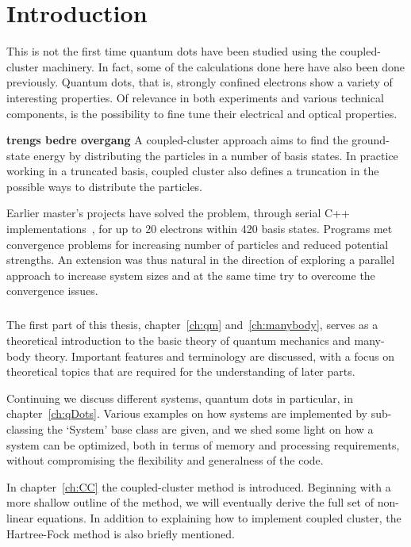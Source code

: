 \chapter{Introduction}
This is not the first time quantum dots have been studied using the coupled-cluster machinery.
In fact, some of the calculations done here have also been done previously.
Quantum dots, that is, strongly confined electrons show a variety of interesting properties.
Of relevance in both experiments and various technical components, is the possibility to fine tune their electrical and optical properties.
 
{\bf trengs bedre overgang}
A coupled-cluster approach aims to find the ground-state energy by distributing the particles in a number of basis states.
In practice working in a truncated basis, coupled cluster also defines a truncation in the possible ways to distribute the particles.

Earlier master's projects have solved the problem, through serial C++ implementations~\cite{marte,mplohne,ymwang}, for up to 20 electrons within 420 basis states.
Programs met convergence problems for increasing number of particles and reduced potential strengths.
An extension was thus natural in the direction of exploring a parallel approach to increase system sizes and at the same time try to overcome the convergence issues.

\paragraph{}
The first part of this thesis, chapter~\ref{ch:qm} and~\ref{ch:manybody}, serves as a theoretical introduction to the basic theory of quantum mechanics and many-body theory.
Important features and terminology are discussed, with a focus on theoretical topics that are required for the understanding of later parts.

Continuing we discuss different systems, quantum dots in particular, in chapter~\ref{ch:qDots}.
Various examples on how systems are implemented by sub-classing the `System' base class are given, and we shed some light on how a system can be optimized, both in  terms of memory and processing requirements, without compromising the flexibility and generalness of the code.

In chapter~\ref{ch:CC} the coupled-cluster method is introduced.
Beginning with a more shallow outline of the method, we will eventually derive the full set of non-linear equations.
In addition to explaining how to implement coupled cluster, the Hartree-Fock method is also briefly mentioned.

